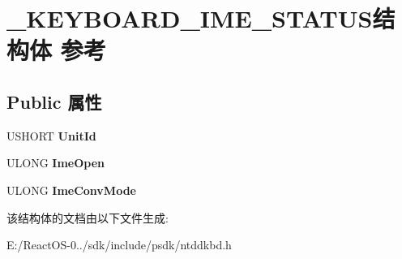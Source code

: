 \hypertarget{struct___k_e_y_b_o_a_r_d___i_m_e___s_t_a_t_u_s}{}\section{\+\_\+\+K\+E\+Y\+B\+O\+A\+R\+D\+\_\+\+I\+M\+E\+\_\+\+S\+T\+A\+T\+U\+S结构体 参考}
\label{struct___k_e_y_b_o_a_r_d___i_m_e___s_t_a_t_u_s}
\subsection*{Public 属性}
\begin{DoxyCompactItemize}
\item 
\mbox{\label{struct___k_e_y_b_o_a_r_d___i_m_e___s_t_a_t_u_s_ab909595b677e48485c5d66a24b7c81b6}} 
U\+S\+H\+O\+RT {\bfseries Unit\+Id}
\item 
\mbox{\label{struct___k_e_y_b_o_a_r_d___i_m_e___s_t_a_t_u_s_a0618929aad32ce401cdfeca95d3c6341}} 
U\+L\+O\+NG {\bfseries Ime\+Open}
\item 
\mbox{\label{struct___k_e_y_b_o_a_r_d___i_m_e___s_t_a_t_u_s_a6d2d1585055b72863b39400a7219316c}} 
U\+L\+O\+NG {\bfseries Ime\+Conv\+Mode}
\end{DoxyCompactItemize}


该结构体的文档由以下文件生成\+:\begin{DoxyCompactItemize}
\item 
E\+:/\+React\+O\+S-\/0../sdk/include/psdk/ntddkbd.\+h\end{DoxyCompactItemize}
